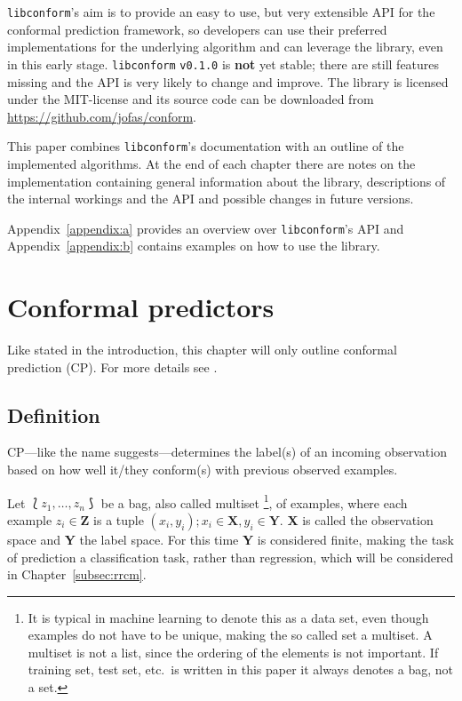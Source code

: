 \documentclass[twoside,11pt]{article}
\def\version{\texttt{v0.1.0}}
\def\libconform{\texttt{libconform}}
\begin{document}
\libconform's aim is to provide an easy to use, but very
extensible API for the conformal prediction framework, so
developers can use their preferred implementations for the
underlying algorithm and can leverage the library, even in
this early stage.
\libconform{} \version{} is \textbf{not} yet stable; there
are still features missing and the API is very likely to
change and improve.
The library is licensed under the MIT-license and its
source code can be downloaded from
\url{https://github.com/jofas/conform}.

This paper combines \libconform{}'s documentation with an
outline of the implemented algorithms.
At the end of each chapter there are notes on the
implementation containing general information about the
library, descriptions of the internal workings and the API
and possible changes in future versions.

Appendix~\ref{appendix:a} provides an overview over
\libconform's API and Appendix~\ref{appendix:b} contains
examples on how to use the library.

\section{Conformal predictors}
\label{sec:cp}

Like stated in the introduction, this chapter will only
outline conformal prediction (CP). For more details see
\citet{alrw}.

\subsection*{Definition}

CP---like the name suggests---determines the label(s) of an
incoming observation based on how well it/they conform(s)
with previous observed examples.

Let $\Lbag z_1,\dots,z_n \Rbag$ be a bag, also called
multiset%
\footnote{It is typical in machine learning to denote this
as a data set, even though examples do not have to
be unique, making the so called set a multiset. A multiset
is not a list, since the ordering of the elements is not
important. If training set, test set, etc.\ is written in
this paper it always denotes a bag, not a set.},
of examples, where each example $z_i \in \textbf{Z}$ is a
tuple $(x_i,y_i); x_i \in \textbf{X}, y_i \in \textbf{Y}$.
\textbf{X} is called the observation space and \textbf{Y}
the label space. For this time \textbf{Y} is considered
finite, making the task of prediction a classification
task, rather than regression, which will be considered in
Chapter~\ref{subsec:rrcm}.
\end{document}
